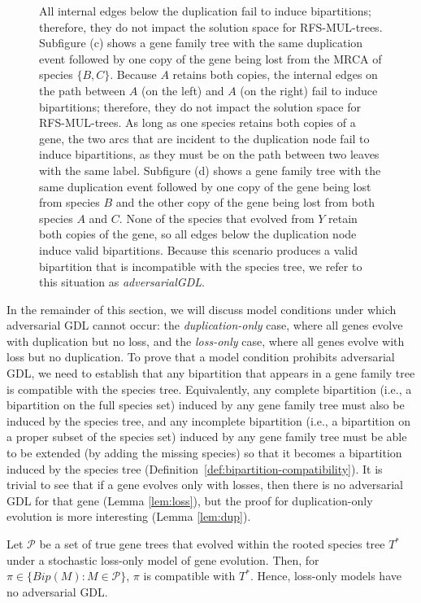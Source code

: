 \begin{figure}[!h]
{All internal edges below the duplication fail to induce bipartitions; therefore, they do not impact the solution space for RFS-MUL-trees.
Subfigure (c) shows a gene family tree with the same duplication event followed by one copy of the gene being lost from the MRCA of species $\{B, C\}$.
Because $A$ retains both copies, the internal edges on the path between $A$ (on the left) and $A$ (on the right) fail to induce bipartitions; therefore, they do not impact the solution space for RFS-MUL-trees.
As long as one species retains both copies of a gene, the two arcs that are incident to the duplication node fail to induce bipartitions, as they must be on the path between two leaves with the same label.
Subfigure (d) shows a gene family tree with the same duplication event followed by one copy of the gene being lost from species $B$ and the other copy of the gene being lost from both species $A$ and $C$.
None of the species that evolved from $Y$ retain both copies of the gene, so all edges below the duplication node induce valid bipartitions.
Because this scenario produces a valid bipartition that is incompatible with the species tree, we refer to this situation as \textit{\gls{adversarialGDL}}. 
	}
	\label{fig:2}
\end{figure}

\clearpage

In the remainder of this section, we will discuss model conditions under which adversarial GDL cannot occur: the {\em duplication-only} case, where all genes evolve with duplication but no loss, and the {\em loss-only} case, where all genes evolve with loss but no duplication.
To prove that a model condition prohibits adversarial GDL, we need to establish that any bipartition that appears in a gene family tree is compatible with the species tree.
Equivalently, any complete bipartition (i.e., a bipartition on the full species set) induced by any gene family tree must also be induced by the species tree, and any incomplete bipartition (i.e., a bipartition on a proper subset of the species set) induced by any gene family tree must be able to be extended (by adding the missing species) so that it becomes a bipartition induced by the species tree (Definition~\ref{def:bipartition-compatibility}).
It is trivial to see that if a gene evolves only with losses, then there is no adversarial GDL for that gene (Lemma \ref{lem:loss}), but the proof for duplication-only evolution is more interesting (Lemma \ref{lem:dup}).

\begin{lemma}
\label{lem:loss}
Let $\mathcal{P}$ be a set of true gene trees that evolved within the rooted species tree $T^*$ under a stochastic loss-only model of gene evolution.
Then, for $\pi \in \{ Bip(M) : M \in \mathcal{P} \}$, $\pi$ is compatible with $T^*$. 
Hence, loss-only models have no adversarial GDL.
\end{lemma}

